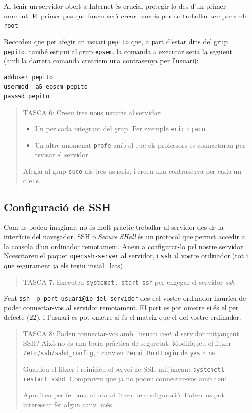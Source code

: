 \documentclass{practicaitic}
\begin{document}
Al tenir un servidor obert a Internet és crucial protegir-lo des d'un primer
moment. El primer pas que farem serà crear usuaris per no treballar sempre
amb \texttt{root}.

Recordeu que per afegir un usuari \texttt{pepito} que, a part d'estar dins del
grup \texttt{pepito}, també estigui al grup \texttt{epsem}, la comanda a executar
seria la següent (amb la darrera comanda crearíem una contrasenya per l'usuari):
\begin{verbatim}
adduser pepito
usermod -aG epsem pepito
passwd pepito
\end{verbatim}

\begin{quote}
TASCA 6: Creeu tres nous usuaris al servidor:
\begin{itemize}
  \item Un per cada integrant del grup. Per exemple \texttt{eric} i \texttt{paco}.
  \item Un altre anomenat \texttt{profe} amb el que els professors es connectaran
  per revisar el servidor.
\end{itemize}
Afegiu al grup \texttt{sudo} als tres usuaris, i creeu una contrasenya per
cada un d'ells.
\end{quote}

\subsection{Configuració de SSH}

Com us podeu imaginar, no és molt pràctic treballar al servidor des de la
interfície del navegador. SSH o \textit{Secure SHell} és un protocol que permet
accedir a la consola d'un ordinador remotament. Anem a configurar-lo pel nostre
servidor. Ncessitareu el paquet \texttt{openssh-server} al servidor, i \texttt{ssh}
al vostre ordinador (tot i que segurament ja els teniu instal·lats).

\begin{quote}
TASCA 7: Executeu \texttt{systemctl start ssh} per engegar el servidor \textit{ssh}.
\end{quote}

Fent \texttt{ssh -p port usuari@ip\_del\_servidor} des del vostre ordinador 
hauríeu de poder connectar-vos al servidor remotament. El port es pot ometre si
és el per defecte (22), i l'usuari es pot ometre si és el mateix que el del
vostre ordinador.

\begin{quote}
TASCA 8: Podeu connectar-vos amb l'usuari \textit{root} al servidor mitjançant SSH?
Això no és una bona pràctica de seguretat. Modifiqueu el fitxer \texttt{/etc/ssh/sshd\_config},
i canvieu \texttt{PermitRootLogin} de \verb|yes| a \verb|no|.

Guardeu el fitxer i
reinicieu el servei de SSH mitjançant \texttt{systemctl restart sshd}. Comproveu que
ja no podeu connectar-vos amb \texttt{root}.

Aprofiteu per fer una ullada al fitxer de configuració. Potser us pot interessar
fer algun canvi més.
\end{quote}
\end{document}
